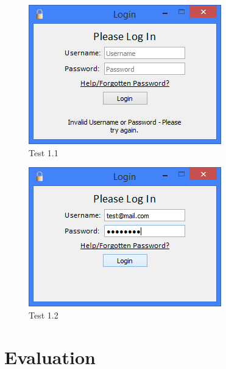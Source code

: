 \begin{landscape}
\begin{figure}[H]
    \includegraphics[width=\textwidth]{./Testing/Evidence/LoginTestFail.png}
    \caption{Test 1.1}  \label{fig:LoginTestFail}
\end{figure}

\begin{figure}[H]
    \includegraphics[width=\textwidth]{./Testing/Evidence/LoginTestSucceed.png}
    \caption{Test 1.2}  \label{fig:LoginTestSucceed}
\end{figure}

\end{landscape}

\section{Evaluation}

